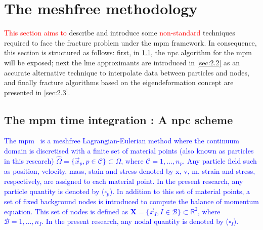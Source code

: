 \documentclass[preprint,12pt,a4paper]{elsarticle}
\begin{document}
\section{The meshfree methodology}
\label{sec:2}

\textcolor{red}{This section aims to} describe and introduce some \textcolor{red}{non-standard}
techniques required to face the fracture problem under the \acrshort{mpm}
framework. In consequence, this section is structured as follows: first, in
\ref{sec:2.1}, the \acrfull{npc} algorithm for the \acrshort{mpm}
will be exposed; next the \acrshort{lme} approximants are
introduced in \ref{sec:2.2} as an accurate alternative technique to
interpolate data between particles and nodes, and finally fracture
algorithms based on the eigendeformation concept are presented in
\ref{sec:2.3}.

\subsection{The \acrshort{mpm} time integration : A \acrlong{npc}  scheme}
\label{sec:2.1}

\textcolor{blue}{The \acrshort{mpm}~\cite{Sulsky1994} is a meshfree Lagrangian-Eulerian method where the continuum \gls{domain} is discretised with a finite set of material points (also known as particles in this research) $\hat{\Omega} = \{ \vec{x}_p, p \in \mathcal{C} \} \subset \Omega$, where $\mathcal{C} = 1, \ldots, n_p$. Any particle field such as position, velocity, mass, stain and stress denoted by \gls{x}, \gls{v}, \gls{m}, \gls{strain} and \gls{stress}, respectively, are assigned to each material point. In the present research, any particle quantity is denoted by ($\square_p$). In addition to this set of material points, a set of fixed background nodes is introduced to compute the balance of momentum equation. This set of nodes is defined as  $\textbf{X} = \{ \vec{x}_I, I \in \mathcal{B} \} \subset \mathbb{R}^{2}$, where $\mathcal{B} = 1, \ldots, n_I$. In the present research, any nodal quantity is denoted by ($\square_I$).}
\end{document}
